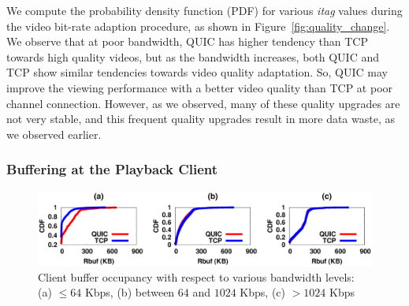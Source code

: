 We compute the probability density function (PDF) for various \textit{itag} values during the video bit-rate adaption procedure, as shown in Figure~\ref{fig:quality_change}. 
We observe that at poor bandwidth, QUIC has higher tendency than TCP towards high quality videos, but as the bandwidth increases, both QUIC and TCP show similar tendencies towards video quality adaptation. So, QUIC may improve the viewing performance with a better video quality than TCP  at poor channel connection. However, as we observed, many of these quality upgrades are not very stable, and this frequent quality upgrades result in more data waste, as we observed earlier. 

\subsubsection{Buffering at the Playback Client}

\begin{figure}[!t]
	\captionsetup[subfigure]{}
	\begin{center}
        \includegraphics[width=\linewidth]{img/plotdata/CDF/Rbuf/plot_rbuf_bucket123}
		\caption{\label{fig:rbuf}Client buffer occupancy with respect to various bandwidth levels: (a) $\leq 64$ Kbps, (b)  between $64$ and $1024$ Kbps, (c) $> 1024$ Kbps}
	\end{center}
\end{figure}


